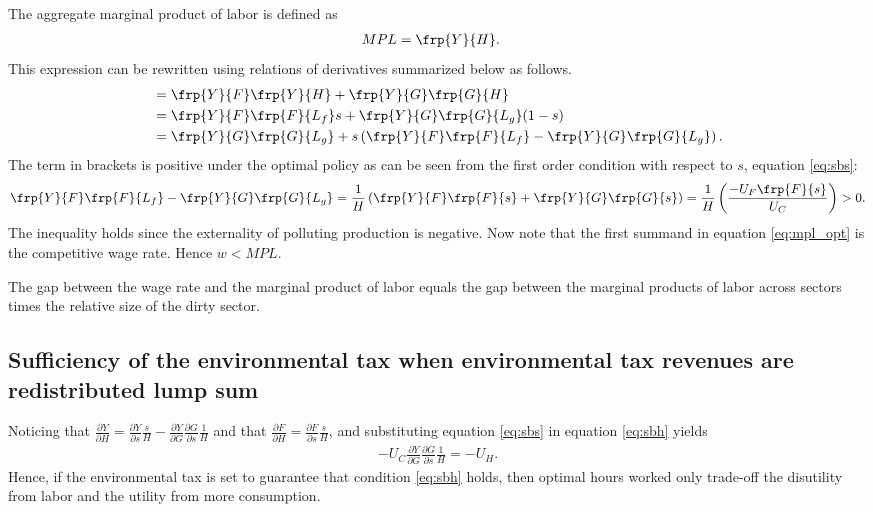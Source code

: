The aggregate marginal product of labor is defined as
\begin{align}
MPL&= \frp{Y}{H}.
\end{align}
This expression can be rewritten using relations of derivatives summarized below as follows.
\begin{align}
&= \frp{Y}{F}\frp{Y}{H}+\frp{Y}{G}\frp{G}{H}\\
&= \frp{Y}{F}\frp{F}{L_f}s+\frp{Y}{G}\frp{G}{L_g}(1-s)\\
&= \frp{Y}{G}\frp{G}{L_g}+ s\left(\frp{Y}{F}\frp{F}{L_f}-\frp{Y}{G}\frp{G}{L_g}\right).\label{eq:mpl_opt}
\end{align}
The term in brackets is positive under the optimal policy as can be seen from the first order condition with respect to $s$, equation \ref{eq:sbs}:
\begin{align}
\frp{Y}{F}\frp{F}{L_f}-\frp{Y}{G}\frp{G}{L_g}=\frac{1}{H}\left(\frp{Y}{F}\frp{F}{s}+\frp{Y}{G}\frp{G}{s}\right)=\frac{1}{H}\left(\frac{-U_F\frp{F}{s}}{U_C}\right)>0.
\end{align}
The inequality holds since the externality of polluting production is negative. %
Now note that the first summand in equation \ref{eq:mpl_opt} is the competitive wage rate.  Hence $w<MPL$.

The gap between the wage rate and the marginal product of labor equals the gap between the marginal products of labor across sectors times the relative size of the dirty sector. 

\subsection{Sufficiency of the environmental tax when environmental tax revenues are redistributed lump sum}\label{app:incometax0}

Noticing that $\frac{\partial Y}{\partial H}= \frac{\partial Y}{\partial s}\frac{s}{H}-\frac{\partial Y}{\partial G}\frac{\partial G}{\partial s}\frac{1}{H}$ and that $\frac{\partial F}{\partial H}=\frac{\partial F}{\partial s}\frac{s}{H}$, and substituting equation \ref{eq:sbs} in equation \ref{eq:sbh} yields
\begin{align}\label{eq:pigou}
-U_C \frac{\partial Y}{\partial G}\frac{\partial G}{\partial s}\frac{1}{H}=-U_H.
\end{align}
Hence, if the environmental tax is set to guarantee that condition \ref{eq:sbh} holds, then optimal hours worked only trade-off the disutility from labor and the utility from more consumption. 

